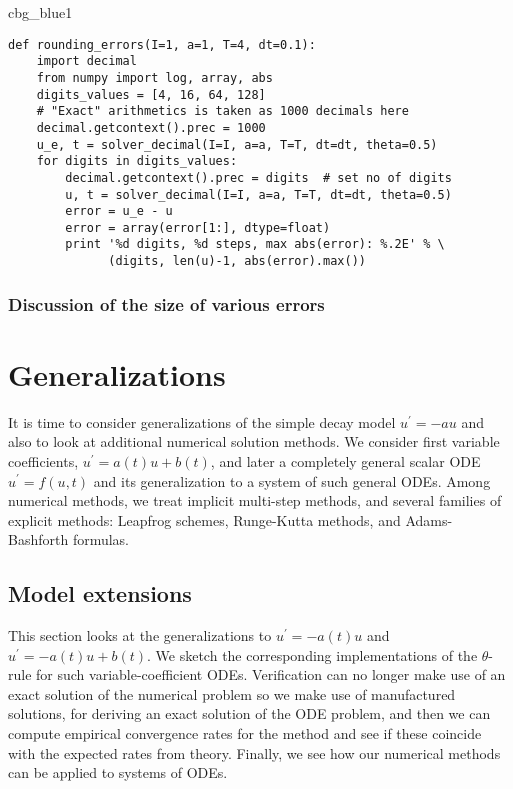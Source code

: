 \documentclass[graybox,sectrefs,envcountresetchap,open=right,final]{svmonodo}
\newenvironment{_cod_tight}[1]{
   \def\FrameCommand{\colorbox{#1}}
   \FrameRule0.6pt\MakeFramed {\FrameRestore}\vskip3mm}
   {\vskip0mm\endMakeFramed}
\newenvironment{cod}[1]{
\bgroup\rmfamily
\fboxsep=0mm\relax
\begin{_cod_tight}{#1}
\list{}{\parsep=-2mm\parskip=0mm\topsep=0pt\leftmargin=2mm
\rightmargin=2\leftmargin\leftmargin=4pt\relax}
\item\relax}
{\endlist\end{_cod_tight}\egroup}
\begin{document}
\begin{cod}{cbg_blue1}\begin{Verbatim}[numbers=none,fontsize=\fontsize{9pt}{9pt},baselinestretch=0.95,xleftmargin=2mm]
def rounding_errors(I=1, a=1, T=4, dt=0.1):
    import decimal
    from numpy import log, array, abs
    digits_values = [4, 16, 64, 128]
    # "Exact" arithmetics is taken as 1000 decimals here
    decimal.getcontext().prec = 1000
    u_e, t = solver_decimal(I=I, a=a, T=T, dt=dt, theta=0.5)
    for digits in digits_values:
        decimal.getcontext().prec = digits  # set no of digits
        u, t = solver_decimal(I=I, a=a, T=T, dt=dt, theta=0.5)
        error = u_e - u
        error = array(error[1:], dtype=float)
        print '%d digits, %d steps, max abs(error): %.2E' % \ 
              (digits, len(u)-1, abs(error).max())
\end{Verbatim}
\end{cod}
\noindent

\subsection{Discussion of the size of various errors}


\chapter{Generalizations}

It is time to consider generalizations of the simple decay model
$u^{\prime}=-au$ and also to look at additional numerical solution
methods.  We consider first variable coefficients, $u^{\prime}=a(t)u +
b(t)$, and later a completely general scalar ODE $u^{\prime}=f(u,t)$
and its generalization to a system of such general ODEs.  Among
numerical methods, we treat implicit multi-step methods, and several
families of explicit methods: Leapfrog schemes, Runge-Kutta methods,
and Adams-Bashforth formulas.

\section{Model extensions}

This section looks at the generalizations to $u^{\prime}=-a(t)u$
and $u^{\prime}=-a(t)u + b(t)$. We sketch the corresponding
implementations of the $\theta$-rule for such variable-coefficient ODEs.
Verification can no longer make use of an exact solution of the
numerical problem so we make use of manufactured solutions,
for deriving an exact solution of the ODE problem, and then we can
compute empirical convergence rates for the method and see if these
coincide with the expected rates from theory.
Finally, we see how our numerical methods can be applied to systems
of ODEs.
\end{document}
